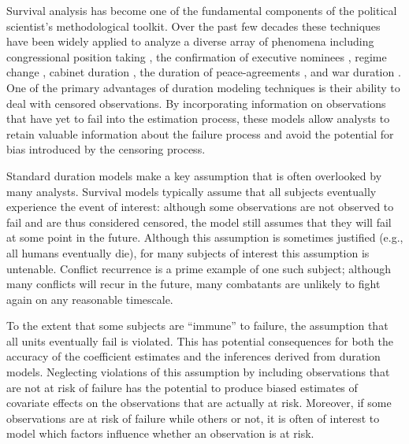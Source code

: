 \documentclass{article}
\begin{document}
	\pagebreak
	
	Survival analysis has become one of the fundamental components of the political scientist's methodological toolkit. Over the past few decades these techniques have been widely applied to analyze a diverse array of phenomena including  congressional position taking \citep{box-steffensmeier1997}, the confirmation of executive nominees \citep{ostrander2015}, regime change \citep{gates2016}, cabinet duration \citep{somer-topcu2008}, the duration of peace-agreements \citep{fortna2004b}, and war duration \citep{weisiger2013}. One of the primary advantages of duration modeling techniques is their ability to deal with censored observations. By incorporating information on observations that have yet to fail into the estimation process, these models allow analysts to retain valuable information about the failure process and avoid the potential for bias introduced by the censoring process. 
	
	Standard duration models make a key assumption that is often overlooked by many analysts. Survival models typically assume that all subjects eventually experience the event of interest: although some observations are not observed to fail and are thus considered censored, the model still assumes that they will fail at some point in the future. Although this assumption is sometimes justified (e.g., all humans eventually die), for many subjects of interest this assumption is untenable. Conflict recurrence is a prime example of one such subject; although many conflicts will recur in the future, many combatants are unlikely to fight again on any reasonable timescale. 
	
	To the extent that some subjects are “immune” to failure, the assumption that all units eventually fail is violated. This has potential consequences for both the accuracy of the coefficient estimates and the inferences derived from duration models. Neglecting violations of this assumption by including observations that are not at risk of failure has the potential to produce biased estimates of covariate effects on the observations that are actually at risk. Moreover, if some observations are at risk of failure while others or not, it is often of interest to model which factors influence whether an observation is at risk.
	
	
\end{document}
